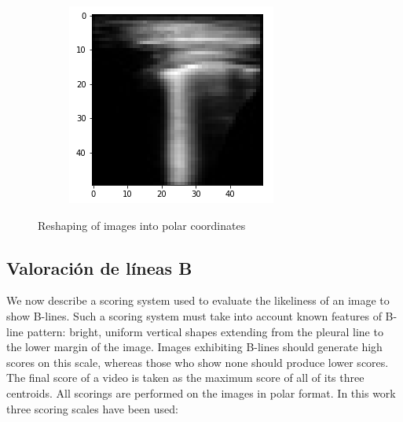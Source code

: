 \documentclass[11pt]{article} %
\begin{document}
\begin{figure}
\begin{subfigure}{0.35\textwidth}
		\caption{}
		\end{subfigure}
		\begin{subfigure}{0.30\textwidth}
		\includegraphics[width=\textwidth]{figuras/polar.png}
		\caption{}
		\end{subfigure}
	\caption{Reshaping of images into polar coordinates}
	\end{figure}
	

\subsection{Valoración de líneas B}

	We now describe a scoring system used to evaluate the likeliness of an image to show B-lines. Such a scoring system must take into account known features of B-line pattern: bright, uniform vertical shapes extending from the pleural line to the lower margin of the image. Images exhibiting B-lines should generate high scores on this scale, whereas those who show none should produce lower scores. The final score of a video is taken as the maximum score of all of its three centroids. All scorings are performed on the images in polar format. In this work three scoring scales have been used:
	
\end{document}
